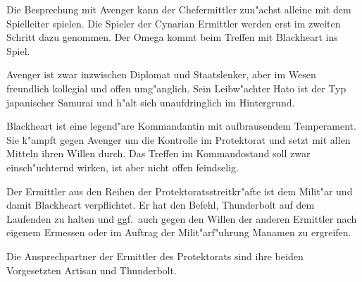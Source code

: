 \begin{remarks}
	Die Besprechung mit Avenger kann der Chefermittler zun"achst alleine mit dem Spielleiter spielen. Die Spieler der Cynarian Ermittler werden erst im zweiten Schritt dazu genommen. Der Omega kommt beim Treffen mit Blackheart ins Spiel.
	
	Avenger ist zwar inzwischen Diplomat und Staatslenker, aber im Wesen freundlich kollegial und offen umg"anglich. Sein Leibw"achter Hato ist der Typ japanischer Samurai und h"alt sich unaufdringlich im Hintergrund.
	
	Blackheart ist eine legend"are Kommandantin mit aufbrausendem Temperament. Sie k"ampft gegen Avenger um die Kontrolle im Protektorat und setzt mit allen Mitteln ihren Willen durch. Das Treffen im Kommandostand soll zwar einsch"uchternd wirken, ist aber nicht offen feindselig.
	
	Der Ermittler aus den Reihen der Protektoratsstreitkr"afte ist dem Milit"ar und damit Blackheart verpflichtet. Er hat den Befehl, Thunderbolt auf dem Laufenden zu halten und ggf.~auch gegen den Willen der anderen Ermittler nach eigenem Ermessen oder im Auftrag der Milit"arf"uhrung Ma\3namen zu ergreifen.

	Die Ansprechpartner der Ermittler des Protektorats sind ihre beiden Vorgesetzten Artisan und Thunderbolt.
\end{remarks}

